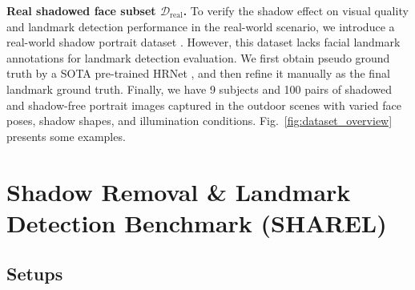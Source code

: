 \documentclass[10pt,twocolumn,letterpaper]{article}
\newcommand{\figref}[1]{Fig.~\ref{#1}}
\renewcommand{\paragraph}[1]{\vspace{1.25mm}\noindent\textbf{#1}}
\begin{document}
\paragraph{Real shadowed face subset $\mathcal{D}_\text{real}$.} To verify the shadow effect on visual quality and landmark detection performance in the real-world scenario, we introduce a real-world shadow portrait dataset \cite{zhang2020portrait}.
%
However, this dataset lacks facial landmark annotations for landmark detection evaluation. We first obtain pseudo ground truth by a SOTA pre-trained HRNet \cite{wang2020deep}, and then refine it manually as the final landmark ground truth.
%
Finally, we have 9 subjects and 100 pairs of shadowed and shadow-free portrait images captured in the outdoor scenes with varied face poses, shadow shapes, and illumination conditions. \figref{fig:dataset_overview} presents some examples.



\section{Shadow Removal \& Landmark Detection Benchmark (SHAREL)}
%

\subsection{Setups} \label{subsec:dataset}

\end{document}
